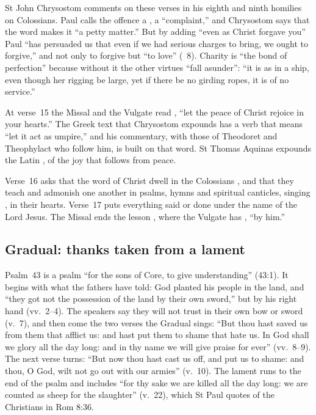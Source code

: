 St John Chrysostom comments on these verses in his eighth and ninth homilies
on Colossians. Paul calls the offence a , a ``complaint,''
and Chrysostom says that the word makes it ``a petty matter.'' But by adding
``even as Christ forgave you'' Paul ``has persuaded us that even if we had
serious charges to bring, we ought to forgive,'' and not only to forgive but
``to love'' (\ 8). Charity is ``the bond of perfection''
because without it the other virtues ``fall asunder'': ``it is as in a ship,
even though her rigging be large, yet if there be no girding ropes, it is of
no service.''

At verse~15 the Missal and the Vulgate read , ``let the peace of Christ rejoice in your hearts.'' The
Greek text that Chrysostom expounds has a verb that means ``let it act as
umpire,'' and his commentary, with those of Theodoret and Theophylact who
follow him, is built on that word. St Thomas Aquinas expounds the Latin
, of the joy that follows from peace.

Verse~16 asks that the word of Christ dwell in the Colossians
, and that they teach and admonish one another in psalms,
hymns and spiritual canticles, singing , in their hearts.
Verse~17 puts everything said or done under the name of the Lord Jesus. The
Missal ends the lesson , where the
Vulgate has , ``by him.''

\subsection{Gradual: thanks taken from a lament}
\label{sec:element-gradual}

Psalm~43 is a psalm ``for the sons of Core, to give understanding'' (43:1).
It begins with what the fathers have told: God planted his people in the land,
and ``they got not the possession of the land by their own sword,'' but by
his right hand (vv.~2--4). The speakers say they will not trust in their own
bow or sword (v.~7), and then come the two verses the Gradual sings: ``But
thou hast saved us from them that afflict us: and hast put them to shame that
hate us. In God shall we glory all the day long: and in thy name we will give
praise for ever'' (vv.~8--9). The next verse turns: ``But now thou hast cast
us off, and put us to shame: and thou, O God, wilt not go out with our
armies'' (v.~10). The lament runs to the end of the psalm and includes ``for
thy sake we are killed all the day long: we are counted as sheep for the
slaughter'' (v.~22), which St Paul quotes of the Christians in Rom 8:36.

